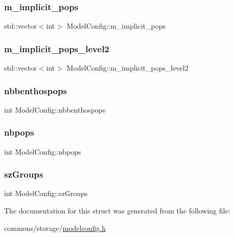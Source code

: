 \subsubsection{\texorpdfstring{m\_implicit\_pops}{m\_implicit\_pops}}
{\footnotesize\ttfamily std\+::vector$<$int$>$ Model\+Config\+::m\+\_\+implicit\+\_\+pops}

\mbox{\label{struct_model_config_a598e1f7db8c36aa6309ace7470cd4670}} 
\subsubsection{\texorpdfstring{m\_implicit\_pops\_level2}{m\_implicit\_pops\_level2}}
{\footnotesize\ttfamily std\+::vector$<$int$>$ Model\+Config\+::m\+\_\+implicit\+\_\+pops\+\_\+level2}

\mbox{\label{struct_model_config_ac9b76a1888fe723ba1747f02f51f0274}} 
\subsubsection{\texorpdfstring{nbbenthospops}{nbbenthospops}}
{\footnotesize\ttfamily int Model\+Config\+::nbbenthospops}

\mbox{\label{struct_model_config_a10f0d465214f96409224887f14d1b9f0}} 
\subsubsection{\texorpdfstring{nbpops}{nbpops}}
{\footnotesize\ttfamily int Model\+Config\+::nbpops}

\mbox{\label{struct_model_config_a66e3ca673d92470cd164e588348dabbe}} 
\subsubsection{\texorpdfstring{szGroups}{szGroups}}
{\footnotesize\ttfamily int Model\+Config\+::sz\+Groups}



The documentation for this struct was generated from the following file\+:\begin{DoxyCompactItemize}
\item 
commons/storage/\mbox{\hyperlink{modelconfig_8h}{modelconfig.\+h}}\end{DoxyCompactItemize}
